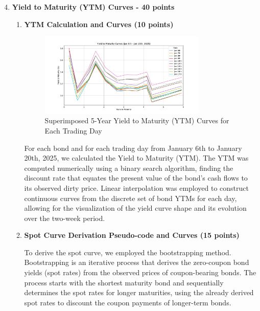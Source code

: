 \documentclass{article}
\begin{document}
\begin{enumerate}
\setcounter{enumi}{3} %

    \item \textbf{Yield to Maturity (YTM) Curves - 40 points}
    \begin{enumerate}
        \item \textbf{YTM Calculation and Curves (10 points)}
        
        \begin{figure}[h!]
                \centering
                \includegraphics[width=0.8\textwidth]{ytm_curves.pdf} %
                \caption{Superimposed 5-Year Yield to Maturity (YTM) Curves for Each Trading Day}
                \label{fig:ytm_curves}
            \end{figure}

            For each bond and for each trading day from January 6th to January 20th, 2025, we calculated the Yield to Maturity (YTM). The YTM was computed numerically using a binary search algorithm, finding the discount rate that equates the present value of the bond's cash flows to its observed dirty price. Linear interpolation was employed to construct continuous curves from the discrete set of bond YTMs for each day, allowing for the visualization of the yield curve shape and its evolution over the two-week period.

        \item \textbf{Spot Curve Derivation Pseudo-code and Curves (15 points)}

            To derive the spot curve, we employed the bootstrapping method. Bootstrapping is an iterative process that derives the zero-coupon bond yields (spot rates) from the observed prices of coupon-bearing bonds. The process starts with the shortest maturity bond and sequentially determines the spot rates for longer maturities, using the already derived spot rates to discount the coupon payments of longer-term bonds.


\end{enumerate}
\end{enumerate}
\end{document}
